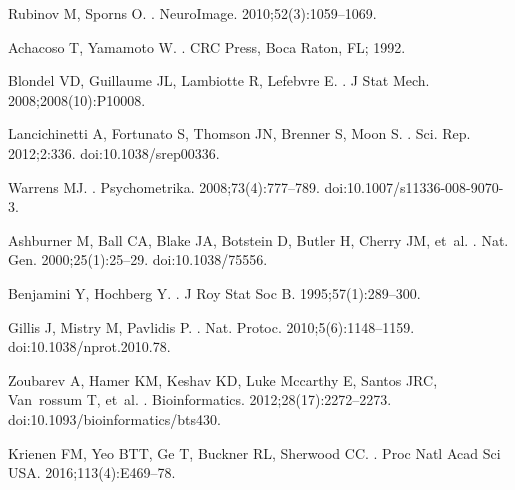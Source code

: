 \documentclass[10pt,letterpaper]{article}
\begin{document}
{\begin{thebibliography}{100}
Rubinov M, Sporns O.
.
\newblock NeuroImage. 2010;52(3):1059--1069.


Achacoso T, Yamamoto W.
.
\newblock CRC Press, Boca Raton, FL; 1992.


Blondel VD, Guillaume JL, Lambiotte R, Lefebvre E.
.
\newblock J Stat Mech. 2008;2008(10):P10008.

Lancichinetti A, Fortunato S, Thomson JN, Brenner S, Moon S.
.
\newblock Sci. Rep. 2012;2:336.
\newblock doi:{10.1038/srep00336}.

Warrens MJ.
.
\newblock Psychometrika. 2008;73(4):777--789.
\newblock doi:{10.1007/s11336-008-9070-3}.

Ashburner M, Ball CA, Blake JA, Botstein D, Butler H, Cherry JM, et~al.
.
\newblock Nat. Gen. 2000;25(1):25--29.
\newblock doi:{10.1038/75556}.


Benjamini Y, Hochberg Y.
.
\newblock J Roy Stat Soc B. 1995;57(1):289--300.

Gillis J, Mistry M, Pavlidis P.
.
\newblock Nat. Protoc. 2010;5(6):1148--1159.
\newblock doi:{10.1038/nprot.2010.78}.

Zoubarev A, Hamer KM, Keshav KD, {Luke Mccarthy} E, Santos JRC, Van~rossum T,
  et~al.
.
\newblock Bioinformatics. 2012;28(17):2272--2273.
\newblock doi:{10.1093/bioinformatics/bts430}.

Krienen FM, Yeo BTT, Ge T, Buckner RL, Sherwood CC.
.
\newblock Proc Natl Acad Sci USA. 2016;113(4):E469--78.


\end{thebibliography}}
\end{document}
